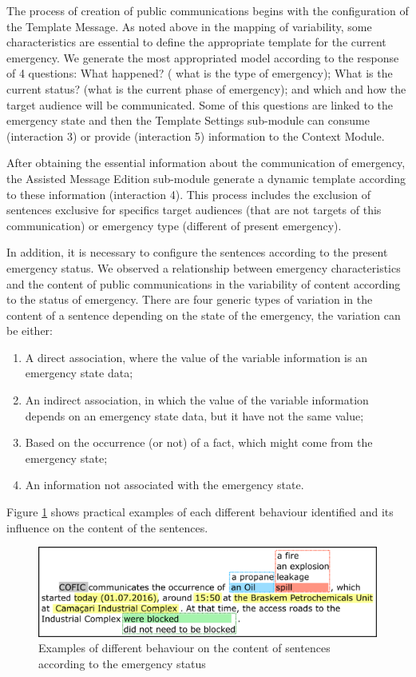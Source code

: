 The process of creation of public communications begins with the configuration of the Template Message. As noted above in the mapping of variability, some characteristics are essential to define the appropriate template for the current emergency. We generate the most appropriated model according to the response of 4 questions: What happened? ( what is the type of emergency); What is the current status? (what is the current phase of emergency); and which and how the target audience will be communicated. Some of this questions are linked to the emergency state and then the Template Settings sub-module can consume (interaction 3) or provide (interaction 5) information to the Context Module. 

After obtaining the essential information about the communication of emergency, the Assisted Message Edition sub-module generate a dynamic template according to these information (interaction 4). This process includes the exclusion of sentences exclusive for specifics target audiences (that are not targets of this communication) or emergency type (different of present emergency).

In addition, it is necessary to configure the sentences according to the present emergency status. We observed a relationship between emergency characteristics and the content of public communications in the variability of content according to the status of emergency. There are four generic types of variation in the content of a sentence depending on the state of the emergency, the variation can be either: 

\begin{enumerate}
   \item A direct association, where the value of the variable information is an emergency state data;
   \item An indirect association, in which the value of the variable information depends on an emergency state data, but it have not the same value;
   \item Based on the occurrence (or not) of a fact, which might come from the emergency state;
   \item An information not associated with the emergency state.
\end{enumerate}

Figure \ref{fig:sentenceContext} shows practical examples of each different behaviour identified and its influence on the content of the sentences.

\begin{figure}[]
\centering
\includegraphics[width=\linewidth]{images/sentences}
\caption{Examples of different behaviour on the content of sentences according to the emergency status}
\label{fig:sentenceContext}
\end{figure}

